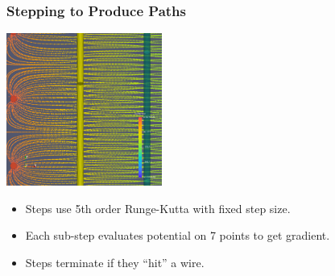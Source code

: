 \documentclass[xcolor=dvipsnames]{beamer}
\begin{document}
\begin{frame}
  \frametitle{Stepping to Produce Paths}
  \begin{center}
    \includegraphics[height=5cm,clip,trim=0cm 0cm 0cm 17cm]{steps/upaths3.png}
  \end{center}
  \begin{itemize}\footnotesize
  \item Steps use 5th order Runge-Kutta with fixed step size.
  \item Each sub-step evaluates potential on 7 points to get gradient.
  \item Steps terminate if they ``hit'' a wire.
  \end{itemize}

\end{frame}
\end{document}
